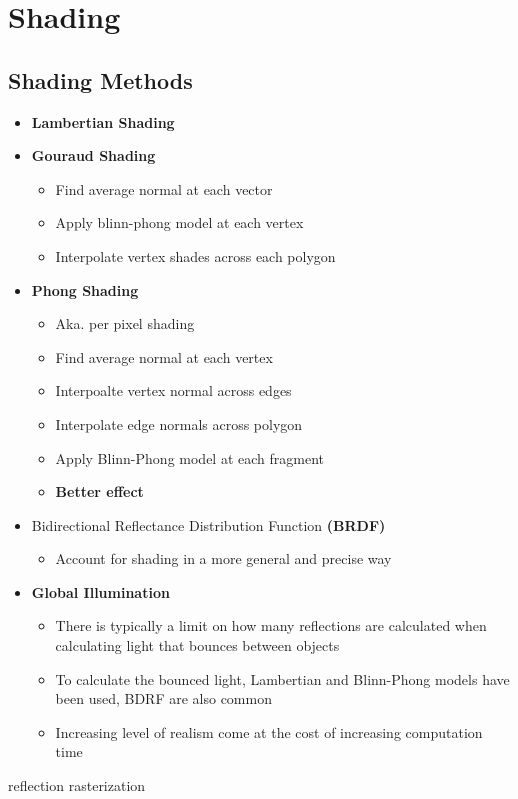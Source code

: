 \chapter{Shading}

\section{Shading Methods}

  \begin{itemize}
    \item \textbf{Lambertian Shading}
    \item \textbf{Gouraud Shading}
    \begin{itemize}
      \item Find average normal at each vector
      \item Apply blinn-phong model at each vertex
      \item Interpolate vertex shades across each polygon
    \end{itemize}

    \item \textbf{Phong Shading}
    \begin{itemize}
      \item Aka. per pixel shading
      \item Find average normal at each vertex
      \item Interpoalte vertex normal across edges
      \item Interpolate edge normals across polygon
      \item Apply Blinn-Phong model at each fragment
      \item \textbf{Better effect}
    \end{itemize}

    \item Bidirectional Reflectance Distribution Function \textbf{(BRDF)}
    \begin{itemize}
      \item Account for shading in a more general and precise way
    \end{itemize}

    \item \textbf{Global Illumination}
    \begin{itemize}
      \item There is typically a limit on how many reflections are calculated
      when calculating light that bounces between objects
      \item To calculate the bounced light, Lambertian and Blinn-Phong models
      have been used, BDRF are also common
      \item Increasing level of realism come at the cost of increasing
      computation time
    \end{itemize}
  \end{itemize}

{reflection}
{rasterization}
